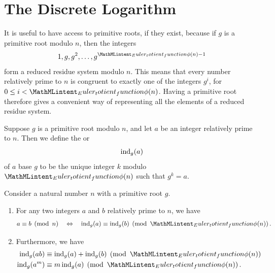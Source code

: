 \section{The Discrete Logarithm}

It is useful to have access to primitive roots, if they exist, because if $g$ is a primitive root modulo $n$, then the integers
\begin{equation*}
  1,g,g^2,\ldots,g^{\totient(n)-1}
\end{equation*}
form a reduced residue system modulo $n$. This means that every number relatively prime to $n$ is congruent to exactly one of the integers $g^i$, for $0\leq i<\totient(n)$. Having a primitive root therefore gives a convenient way of representing all the elements of a reduced residue system.

\begin{definition}
  Suppose $g$ is a primitive root modulo $n$, and let $a$ be an integer relatively prime to $n$. Then we define the  or 
  \begin{equation*}
    \operatorname{ind}_g(a)
  \end{equation*}
  of $a$ base $g$ to be the unique integer $k$ modulo $\totient(n)$ such that $g^{k}=a$.
\end{definition}

\begin{theorem}
  Consider a natural number $n$ with a primitive root $g$.
  \begin{enumerate}
  \item For any two integers $a$ and $b$ relatively prime to $n$, we have
    \begin{equation*}
      a\equiv b\pmod{n}\quad\Leftrightarrow\quad\ind_g(a)\equiv\ind_g(b)\pmod{\totient(n)}.
    \end{equation*}
  \item Furthermore, we have
    \begin{align*}
      \ind_g(ab) & \equiv \ind_g(a)+\ind_g(b)\pmod{\totient(n)} \\
      \ind_g(a^m) & \equiv m\ind_g(a)\pmod{\totient(n)}.
    \end{align*}
  \end{enumerate}
\end{theorem}

